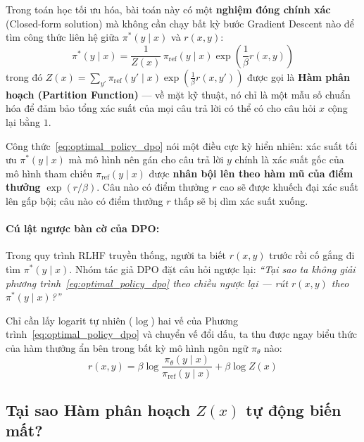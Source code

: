 Trong toán học tối ưu hóa, bài toán này có một \textbf{nghiệm đóng chính xác} (Closed-form solution) mà không cần chạy bất kỳ bước Gradient Descent nào để tìm công thức liên hệ giữa $\pi^*(y \mid x)$ và $r(x, y)$:
\begin{equation}
  \pi^*(y \mid x) = \frac{1}{Z(x)} \, \pi_{\text{ref}}(y \mid x) \exp\left( \frac{1}{\beta} r(x, y) \right)
  \label{eq:optimal_policy_dpo}
\end{equation}
trong đó $Z(x) = \sum_{y'} \pi_{\text{ref}}(y' \mid x) \exp\left(\frac{1}{\beta} r(x, y')\right)$ được gọi là \textbf{Hàm phân hoạch (Partition Function)} --- về mặt kỹ thuật, nó chỉ là một mẫu số chuẩn hóa để đảm bảo tổng xác suất của mọi câu trả lời có thể có cho câu hỏi $x$ cộng lại bằng $1$.

\begin{mentalmodel}
Công thức~\eqref{eq:optimal_policy_dpo} nói một điều cực kỳ hiển nhiên: xác suất tối ưu $\pi^*(y \mid x)$ mà mô hình nên gán cho câu trả lời $y$ chính là xác suất gốc của mô hình tham chiếu $\pi_{\text{ref}}(y \mid x)$ được \textbf{nhân bội lên theo hàm mũ của điểm thưởng} $\exp(r/\beta)$. Câu nào có điểm thưởng $r$ cao sẽ được khuếch đại xác suất lên gấp bội; câu nào có điểm thưởng $r$ thấp sẽ bị dìm xác suất xuống.
\end{mentalmodel}

\paragraph{Cú lật ngược bàn cờ của DPO:}
Trong quy trình RLHF truyền thống, người ta biết $r(x, y)$ trước rồi cố gắng đi tìm $\pi^*(y \mid x)$. Nhóm tác giả DPO \citep{rafailov2023direct} đặt câu hỏi ngược lại: \textit{``Tại sao ta không giải phương trình~\eqref{eq:optimal_policy_dpo} theo chiều ngược lại --- rút $r(x, y)$ theo $\pi^*(y \mid x)$?''}

Chỉ cần lấy logarit tự nhiên ($\log$) hai vế của Phương trình~\eqref{eq:optimal_policy_dpo} và chuyển vế đổi dấu, ta thu được ngay biểu thức của hàm thưởng ẩn bên trong bất kỳ mô hình ngôn ngữ $\pi_\theta$ nào:
\begin{equation}
  r(x, y) = \beta \log \frac{\pi_\theta(y \mid x)}{\pi_{\text{ref}}(y \mid x)} + \beta \log Z(x)
  \label{eq:implicit_reward_with_z}
\end{equation}

\subsection{Tại sao Hàm phân hoạch \texorpdfstring{$Z(x)$}{Z(x)} tự động biến mất?}

